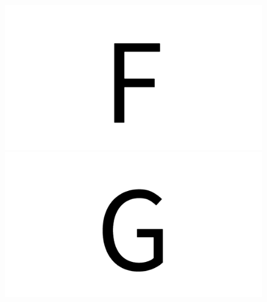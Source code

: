 \documentclass{article}
\begin{document}
\begin{figure}[H]
  \includegraphics[width=\linewidth]{u_F}
\endminipage\hfill
{}
  \includegraphics[width=\linewidth]{u_G}
\endminipage\hfill
\end{figure}
\end{document}
